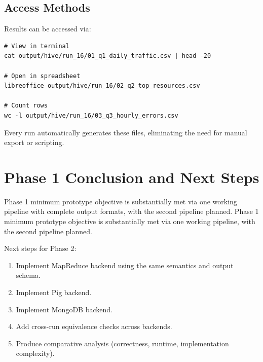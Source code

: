 \documentclass[12pt,a4paper]{article}
\begin{document}
\subsection{Access Methods}
Results can be accessed via:
\begin{lstlisting}
# View in terminal
cat output/hive/run_16/01_q1_daily_traffic.csv | head -20

# Open in spreadsheet
libreoffice output/hive/run_16/02_q2_top_resources.csv

# Count rows
wc -l output/hive/run_16/03_q3_hourly_errors.csv
\end{lstlisting}

Every run automatically generates these files, eliminating the need for manual export or scripting.

\section{Phase 1 Conclusion and Next Steps}
Phase 1 minimum prototype objective is substantially met via one working pipeline with complete output formats, with the second pipeline planned.
Phase 1 minimum prototype objective is substantially met via one working pipeline, with the second pipeline planned.

Next steps for Phase 2:
\begin{enumerate}
    \item Implement MapReduce backend using the same semantics and output schema.
    \item Implement Pig backend.
    \item Implement MongoDB backend.
    \item Add cross-run equivalence checks across backends.
    \item Produce comparative analysis (correctness, runtime, implementation complexity).
\end{enumerate}
\end{document}
